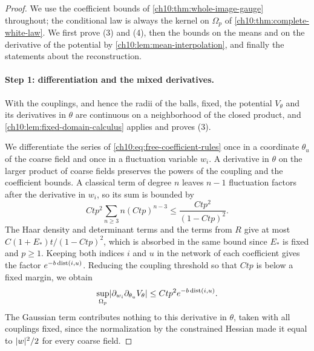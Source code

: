 \begin{proof}
We use the coefficient bounds of \cref{ch10:thm:whole-image-gauge} throughout; the conditional law is always the kernel on $\Omega_p$ of \cref{ch10:thm:complete-white-law}. We first prove (3) and (4), then the bounds on the means and on the derivative of the potential by \cref{ch10:lem:mean-interpolation}, and finally the statements about the reconstruction.

\paragraph{Step 1: differentiation and the mixed derivatives.}
With the couplings, and hence the radii of the balls, fixed, the potential $V_\theta$ and its derivatives in $\theta$ are continuous on a neighborhood of the closed product, and \cref{ch10:lem:fixed-domain-calculus} applies and proves (3).

We differentiate the series of \eqref{ch10:eq:free-coefficient-rules} once in a coordinate $\theta_u$ of the coarse field and once in a fluctuation variable $w_i$. A derivative in $\theta$ on the larger product of coarse fields preserves the powers of the coupling and the coefficient bounds. A classical term of degree $n$ leaves $n-1$ fluctuation factors after the derivative in $w_i$, so its sum is bounded by
\[
 Ctp^2\sum_{n\ge3}n(Ctp)^{n-3}\le\frac{Ctp^2}{(1-Ctp)^2}.
\]
The Haar density and determinant terms and the terms from $R$ give at most $C(1+E_*)t/(1-Ctp)^2$, which is absorbed in the same bound since $E_*$ is fixed and $p\ge1$. Keeping both indices $i$ and $u$ in the network of each coefficient gives the factor $e^{-b\operatorname{dist}(i,u)}$. Reducing the coupling threshold so that $Ctp$ is below a fixed margin, we obtain
\begin{equation}\label{ch10:eq:physical-mixed-score}
 \sup_{\Omega_p}\lvert \partial_{w_i}\partial_{\theta_u}V_\theta\rvert\le Ctp^2e^{-b\operatorname{dist}(i,u)}.
\end{equation}
The Gaussian term contributes nothing to this derivative in $\theta$, taken with all couplings fixed, since the normalization by the constrained Hessian made it equal to $\lvert w\rvert^2/2$ for every coarse field.


\end{proof}
